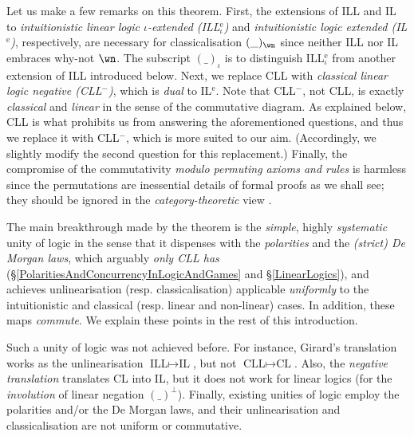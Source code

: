 \documentclass[a4paper]{article}
\theoremstyle{definition}
\theoremstyle{theorem}
\theoremstyle{remark}
\begin{document}
Let us make a few remarks on this theorem.
First, the extensions of ILL and IL to \emph{intuitionistic linear logic $\iota$-extended (ILL$^{\text{e}}_\iota$)} and \emph{intuitionistic logic extended (IL$^{\text{e}}$)}, respectively, are necessary for classicalisation $(\_)_\wn$ since neither ILL nor IL embraces why-not $\wn$.
The subscript $(\_)_\iota$ is to distinguish ILL$^{\text{e}}_\iota$ from another extension of ILL introduced below.
Next, we replace CLL with \emph{classical linear logic negative (CLL$^-$)}, which is \emph{dual} to IL$^{\text{e}}$. %
Note that CLL$^-$, not CLL, is exactly \emph{classical} and \emph{linear} in the sense of the commutative diagram.
As explained below, CLL is what prohibits us from answering the aforementioned questions, and thus we replace it with CLL$^-$, which is more suited to our aim.
(Accordingly, we slightly modify the second question for this replacement.)
Finally, the compromise of the commutativity \emph{modulo permuting axioms and rules} is harmless since the permutations are inessential details of formal proofs as we shall see; they should be ignored in the \emph{category-theoretic} view \cite{lambek1988introduction}.

The main breakthrough made by the theorem is the \emph{simple}, highly \emph{systematic} unity of logic in the sense that it dispenses with the \emph{polarities} and the \emph{(strict) De Morgan laws}, which arguably \emph{only CLL has} (\S\ref{PolaritiesAndConcurrencyInLogicAndGames} and \S\ref{LinearLogics}), and achieves unlinearisation (resp. classicalisation) applicable \emph{uniformly} to the intuitionistic and classical (resp. linear and non-linear) cases.
In addition, these maps \emph{commute}.
We explain these points in the rest of this introduction.

Such a unity of logic was not achieved before.
For instance, Girard's translation works as the unlinearisation $\text{ILL} \mapsto \text{IL}$, but not $\text{CLL} \mapsto \text{CL}$.
Also, the \emph{negative translation} \cite{godel1933intuitionistischen,gentzen1969widerspruchsfreiheit,kolmogorov1925principe} translates CL into IL, but it does not work for linear logics (for the \emph{involution} of linear negation $(\_)^\bot$).
Finally, existing unities of logic \cite{girard1993unity,mellies2010resource,laurent2003translations} employ the polarities and/or the De Morgan laws, and their unlinearisation and classicalisation are not uniform or commutative.
\end{document}
